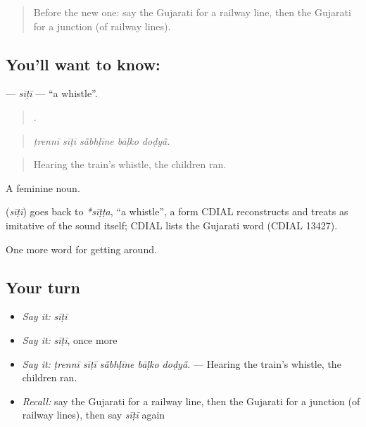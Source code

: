 \begin{quote}
Before the new one: say the Gujarati for a railway line, then the Gujarati for a junction (of railway lines).
\end{quote}

\subsection*{You'll want to know: }
\textbf{} — \emph{sīṭī} — \textquotedblleft{}a whistle\textquotedblright{}.

\begin{quote}
    .
\end{quote}

\begin{quote}
\emph{ṭrennī sīṭī sā̃bhḷīne bāḷko doḍyā̃.}
\end{quote}

\begin{quote}
Hearing the train's whistle, the children ran.
\end{quote}

A feminine noun.

\begin{cousinweb}
\textbf{} (\emph{sīṭī}) goes back to \emph{*sīṭṭa}, \textquotedblleft{}a whistle\textquotedblright{}, a form CDIAL reconstructs and treats as imitative of the sound itself; CDIAL lists the Gujarati word (CDIAL 13427).
\end{cousinweb}

\begin{grammarlens}[title={What you've built}]
One more word for getting around.
\end{grammarlens}

\subsection*{Your turn}
\begin{itemize}
\raggedright
  \item \emph{Say it:} \emph{sīṭī}
  \item \emph{Say it:} \emph{sīṭī}, once more
  \item \emph{Say it:} \emph{ṭrennī sīṭī sā̃bhḷīne bāḷko doḍyā̃.} — Hearing the train's whistle, the children ran.
  \item \emph{Recall:} say the Gujarati for a railway line, then the Gujarati for a junction (of railway lines), then say \emph{sīṭī} again
\end{itemize}

